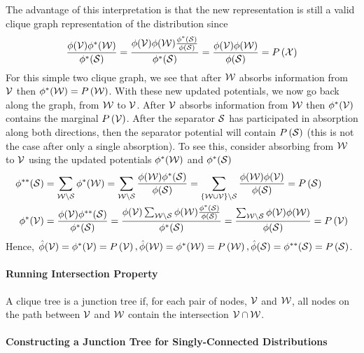 The advantage of this interpretation is that the new representation is still a valid clique graph representation of the distribution since
\begin{align*}
\frac{\phi(\mathcal{V})\phi^*(\mathcal{W})}{\phi^*(\mathcal{S})}=\frac{\phi(\mathcal{V})\phi(\mathcal{W})\frac{\phi^*(\mathcal{S})}{\phi(\mathcal{S})}}{\phi^*(\mathcal{S})}=\frac{\phi(\mathcal{V})\phi(\mathcal{W})}{\phi(\mathcal{S})}=P\left(\mathcal{X}\right)
\end{align*}
For this simple two clique graph, we see that after $\mathcal{W}$ absorbs information from $\mathcal{V}$ then $\phi^*(\mathcal{W})=P\left(\mathcal{W}\right)$. With these new updated potentials, we now go back along the graph, from $\mathcal{W}$ to $\mathcal{V}$. After $\mathcal{V}$ absorbs information from $\mathcal{W}$ then $\phi^*(\mathcal{V})$ contains the marginal $P\left(\mathcal{V}\right)$. After the separator $\mathcal{S}$ has participated in absorption along both directions, then the separator potential will contain $P\left(\mathcal{S}\right)$ (this is not the case after only a single absorption). To see this, consider absorbing from $\mathcal{W}$ to $\mathcal{V}$ using the updated potentials $\phi^*(\mathcal{W})$ and $\phi^*(\mathcal{S})$
\begin{align*}
\phi^{**}(\mathcal{S})&=\sum_{\mathcal{W}\setminus\mathcal{S}}\phi^*(\mathcal{W})=\sum_{\mathcal{W}\setminus\mathcal{S}}\frac{\phi(\mathcal{W})\phi^*(\mathcal{S})}{\phi(\mathcal{S})}=\sum_{\{\mathcal{W}\cup\mathcal{V}\}\setminus\mathcal{S}}\frac{\phi(\mathcal{W})\phi(\mathcal{V})}{\phi(\mathcal{S})}=P\left(\mathcal{S}\right) \\
\phi^*(\mathcal{V})&=\frac{\phi(\mathcal{V})\phi^{**}(\mathcal{S})}{\phi^*(\mathcal{S})}=\frac{\phi(\mathcal{V})\sum_{\mathcal{W}\setminus\mathcal{S}}\phi(\mathcal{W})\frac{\phi^*(\mathcal{S})}{\phi(\mathcal{S})}}{\phi^*(\mathcal{S})}=\frac{\sum_{\mathcal{W}\setminus\mathcal{S}}\phi(\mathcal{V})\phi(\mathcal{W})}{\phi(\mathcal{S})}=P\left(\mathcal{V}\right)
\end{align*}
Hence, $\hat{\phi}(\mathcal{V})=\phi^*(\mathcal{V})=P\left(\mathcal{V}\right),\hat{\phi}(\mathcal{W})=\phi^*(\mathcal{W})=P\left(\mathcal{W}\right),\hat{\phi}(\mathcal{S})=\phi^{**}(\mathcal{S})=P\left(\mathcal{S}\right)$.

\paragraph{Running Intersection Property}

A clique tree is a junction tree if, for each pair of nodes, $\mathcal{V}$ and $\mathcal{W}$, all nodes on the path between $\mathcal{V}$ and $\mathcal{W}$ contain the intersection $\mathcal{V}\cap\mathcal{W}$.

\paragraph{Constructing a Junction Tree for Singly-Connected Distributions}

